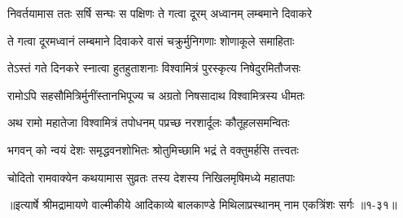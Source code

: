 \twolineshloka
{निवर्तयामास ततः सर्षि सन्घः स पक्षिणः}
{ते गत्वा दूरम् अध्वानम् लम्बमाने दिवाकरे} %

\twolineshloka
{ते गत्वा दूरमध्वानं लम्बमाने दिवाकरे}
{वासं चक्रुर्मुनिगणाः शोणाकूले समाहिताः} %

\twolineshloka
{तेऽस्तं गते दिनकरे स्नात्वा हुतहुताशनाः}
{विश्वामित्रं पुरस्कृत्य निषेदुरमितौजसः} %

\twolineshloka
{रामोऽपि सहसौमित्रिर्मुनींस्तानभिपूज्य च}
{अग्रतो निषसादाथ विश्वामित्रस्य धीमतः} %

\twolineshloka
{अथ रामो महातेजा विश्वामित्रं तपोधनम्}
{पप्रच्छ नरशार्दूलः कौतूहलसमन्वितः} %

\twolineshloka
{भगवन् को न्वयं देशः समृद्धवनशोभितः}
{श्रोतुमिच्छामि भद्रं ते वक्तुमर्हसि तत्त्वतः} %

\twolineshloka
{चोदितो रामवाक्येन कथयामास सुव्रतः}
{तस्य देशस्य निखिलमृषिमध्ये महातपाः} %


॥इत्यार्षे श्रीमद्रामायणे वाल्मीकीये आदिकाव्ये बालकाण्डे मिथिलाप्रस्थानम् नाम एकत्रिंशः सर्गः ॥१-३१॥

